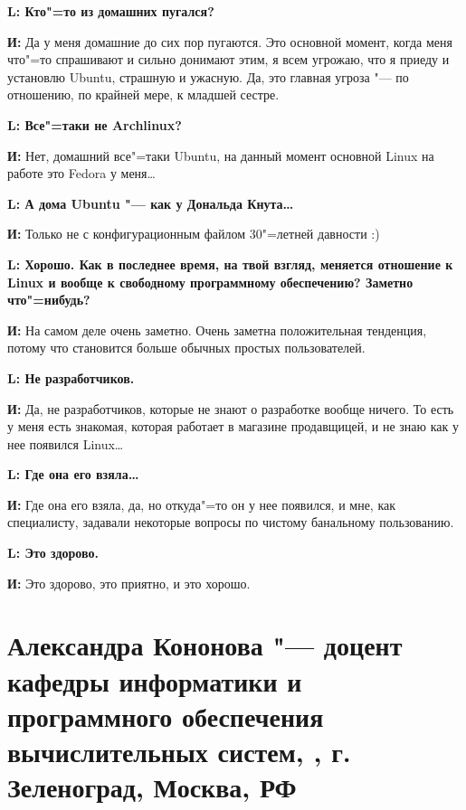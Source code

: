 \documentclass[10pt, a5paper]{article}
\begin{document}
{\noindent \bf L: Кто"=то из домашних пугался?}

{\noindent \bf И:} Да у меня домашние до сих пор пугаются. Это основной момент, когда меня что"=то спрашивают и сильно донимают этим, я всем угрожаю, что я приеду и установлю Ubuntu, страшную и ужасную. Да, это главная угроза "--- по отношению, по крайней мере, к младшей сестре.

{\noindent \bf L: Все"=таки не Archlinux?}

{\noindent \bf И:} Нет, домашний все"=таки Ubuntu, на данный момент основной Linux на работе это Fedora у меня\ldots

{\noindent \bf L: А дома Ubuntu "--- как у Дональда Кнута\ldots}

{\noindent \bf И:} Только не с конфигурационным файлом 30"=летней давности :)

{\noindent \bf L: Хорошо. Как в последнее время, на твой взгляд, меняется отношение к Linux и вообще к свободному программному обеспечению? Заметно что"=нибудь?}

{\noindent \bf И:} На самом деле очень заметно. Очень заметна положительная тенденция, потому что становится больше обычных простых пользователей.

{\noindent \bf L: Не разработчиков.}

{\noindent \bf И:} Да, не разработчиков, которые не знают о разработке вообще ничего. То есть у меня есть знакомая, которая работает в магазине продавщицей, и не знаю как у нее появился Linux\ldots

{\noindent \bf L: Где она его взяла\ldots}

{\noindent \bf И:} Где она его взяла, да, но откуда"=то он у нее появился, и мне, как специалисту, задавали некоторые вопросы по чистому банальному пользованию.

{\noindent \bf L: Это здорово.}

{\noindent \bf И:} Это здорово, это приятно, и это хорошо.

\section[Александра Кононова "--- доцент кафедры информатики и программного обеспечения вычислительных систем, МИЭТ, г. Зеленоград, Москва, РФ]{Александра Кононова "--- доцент кафедры информатики и программного обеспечения вычислительных систем, , г. Зеленоград, Москва, РФ}

\end{document}

